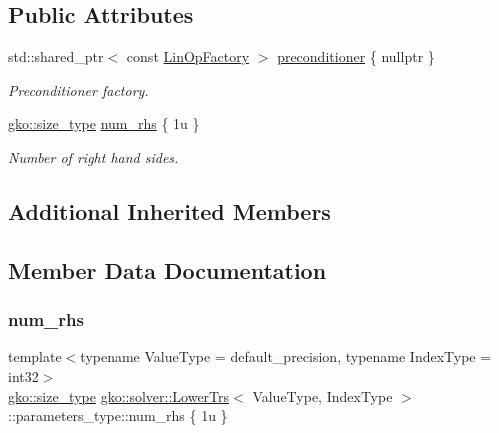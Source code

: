 \subsection*{Public Attributes}
\begin{DoxyCompactItemize}
\item 
\mbox{\label{structgko_1_1solver_1_1LowerTrs_1_1parameters__type_afebfcb78e6e519c5f720e9a984af0f36}} 
std\+::shared\+\_\+ptr$<$ const \hyperlink{classgko_1_1LinOpFactory}{Lin\+Op\+Factory} $>$ \hyperlink{structgko_1_1solver_1_1LowerTrs_1_1parameters__type_afebfcb78e6e519c5f720e9a984af0f36}{preconditioner} \{ nullptr \}
\begin{DoxyCompactList}\small\item\em Preconditioner factory. \end{DoxyCompactList}\item 
\hyperlink{namespacegko_a6e5c95df0ae4e47aab2f604a22d98ee7}{gko\+::size\+\_\+type} \hyperlink{structgko_1_1solver_1_1LowerTrs_1_1parameters__type_a2221c5c06cfb041ad41e5a5bdf9968f2}{num\+\_\+rhs} \{ 1u \}
\begin{DoxyCompactList}\small\item\em Number of right hand sides. \end{DoxyCompactList}\end{DoxyCompactItemize}
\subsection*{Additional Inherited Members}


\subsection{Member Data Documentation}
\mbox{\label{structgko_1_1solver_1_1LowerTrs_1_1parameters__type_a2221c5c06cfb041ad41e5a5bdf9968f2}} 
\subsubsection{\texorpdfstring{num\+\_\+rhs}{num\_rhs}}
{\footnotesize\ttfamily template$<$typename Value\+Type  = default\+\_\+precision, typename Index\+Type  = int32$>$ \\
\hyperlink{namespacegko_a6e5c95df0ae4e47aab2f604a22d98ee7}{gko\+::size\+\_\+type} \hyperlink{classgko_1_1solver_1_1LowerTrs}{gko\+::solver\+::\+Lower\+Trs}$<$ Value\+Type, Index\+Type $>$\+::parameters\+\_\+type\+::num\+\_\+rhs \{ 1u \}\hspace{0.3cm}{\ttfamily [mutable]}}



